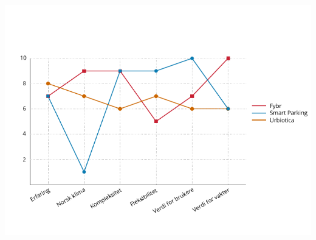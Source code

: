 \documentclass[xetex]{beamer}
\begin{document}
\begin{frame}
	\centerline{\includegraphics{grafikk/grafer/analyse.pdf}}
\end{frame}
\end{document}
